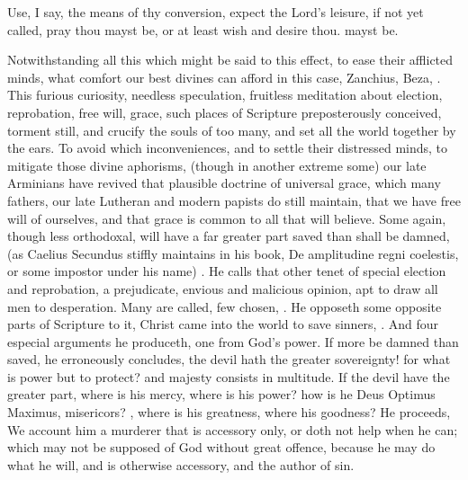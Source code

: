 {Use, I say, the means of thy conversion, expect the Lord's leisure, if
not yet called, pray thou mayst be, or at least wish and desire thou.
mayst be.

Notwithstanding all this which might be said to this effect, to ease
their afflicted minds, what comfort our best divines can afford in this
case, Zanchius, Beza, \etc{}. This furious curiosity, needless speculation,
fruitless meditation about election, reprobation, free will, grace,
such places of Scripture preposterously conceived, torment still, and
crucify the souls of too many, and set all the world together by the
ears. To avoid which inconveniences, and to settle their distressed
minds, to mitigate those divine aphorisms, (though in another extreme
some) our late Arminians have revived that plausible doctrine of
universal grace, which many fathers, our late Lutheran and modern
papists do still maintain, that we have free will of ourselves, and
that grace is common to all that will believe. Some again, though less
orthodoxal, will have a far greater part saved than shall be damned,
(as Caelius Secundus stiffly maintains in his book, De
amplitudine regni coelestis, or some impostor under his name) . He calls that other tenet of
special election and reprobation, a prejudicate, envious and
malicious opinion, apt to draw all men to desperation. Many are called,
few chosen, \etc{}. He opposeth some opposite parts of Scripture to it,
Christ came into the world to save sinners, \etc{}. And four especial
arguments he produceth, one from God's power. If more be damned than
saved, he erroneously concludes, the devil hath the greater
sovereignty! for what is power but to protect? and majesty consists in
multitude. If the devil have the greater part, where is his mercy,
where is his power? how is he Deus Optimus Maximus, misericors? \etc{},
where is his greatness, where his goodness? He proceeds, We
account him a murderer that is accessory only, or doth not help when he
can; which may not be supposed of God without great offence, because he
may do what he will, and is otherwise accessory, and the author of sin.

}
